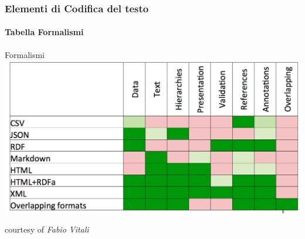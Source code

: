 





\begin{frame}
    \frametitle{Elementi di Codifica del testo}
    \framesubtitle{Tabella Formalismi}
    \addtocounter{nframe}{1}
    
    \begin{block}{Formalismi}
	    \includegraphics[width=.5\textwidth]{imgs/TabellaFormalismiCodificaTesto.png}
    \end{block}
    courtesy of \textit{Fabio Vitali}

\end{frame}


